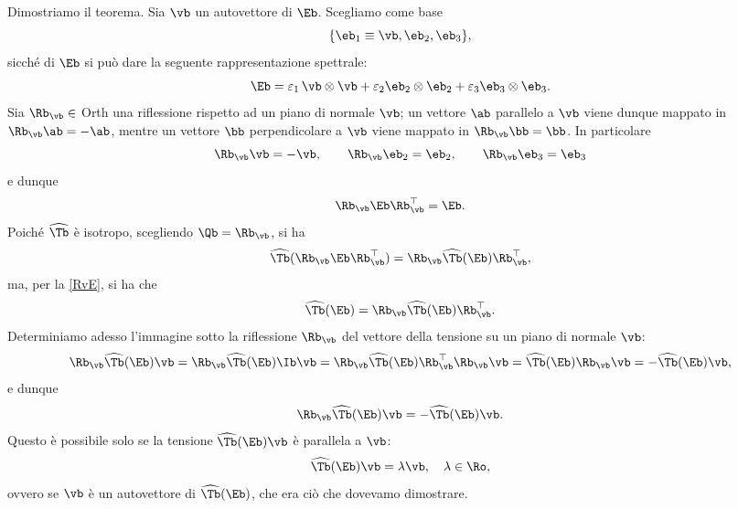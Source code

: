 Dimostriamo il teorema. Sia $\vb$ un autovettore di $\Eb$. Scegliamo come base
\begin{equation}
	\{\eb_1\equiv \vb, \eb_2, \eb_3  \},
\end{equation}
sicché di $\Eb$ si può dare la seguente rappresentazione spettrale:
\begin{equation}
	\Eb =\varepsilon_1\, \vb \otimes \vb +\varepsilon_2 \eb_2 \otimes \eb_2+ \varepsilon_3 \eb_3 \otimes \eb_3.
\end{equation}
Sia $\Rb_\vb\in$ Orth una riflessione rispetto ad un piano di normale $\vb$; un vettore $\ab$ parallelo a $\vb$ viene dunque mappato in $\Rb_\vb\ab=-\ab$, mentre un vettore $\bb$ perpendicolare a $\vb$ viene mappato in $\Rb_\vb\bb=\bb$. In particolare
\begin{equation}
	\Rb_\vb\vb =-\vb, \qquad \Rb_\vb\eb_2=\eb_2, \qquad \Rb_\vb\eb_3=\eb_3
\end{equation}
e dunque
\begin{equation}\label{RvE}
	\Rb_\vb\Eb \Rb_\vb^\top=\Eb.
\end{equation}
Poiché $\widehat{\Tb}$ è isotropo, scegliendo $\Qb=\Rb_\vb$, si ha
\begin{equation}
	\widehat{\Tb}(\Rb_\vb\Eb \Rb_\vb^\top)=\Rb_\vb\widehat{\Tb}(\Eb)\Rb_\vb^\top,
\end{equation}
ma, per la \eqref{RvE}, si ha che
\begin{equation}
	\widehat{\Tb}(\Eb)=\Rb_\vb\widehat{\Tb}(\Eb)\Rb_\vb^\top.
\end{equation}
Determiniamo adesso l'immagine sotto la riflessione $\Rb_\vb$ del vettore della tensione su un piano di normale $\vb$:
\begin{equation}
	\Rb_\vb\widehat{\Tb}(\Eb)\vb=	\Rb_\vb\widehat{\Tb}(\Eb)\Ib\vb=\Rb_\vb\widehat{\Tb}(\Eb)\Rb_\vb^\top\Rb_\vb \vb=\widehat{\Tb}(\Eb)\Rb_\vb \vb=-\widehat{\Tb}(\Eb)\vb,
\end{equation}
e dunque
\begin{equation}
\Rb_\vb\widehat{\Tb}(\Eb)\vb=-\widehat{\Tb}(\Eb)\vb.
\end{equation}
Questo è possibile solo se la tensione $\widehat{\Tb}(\Eb)\vb$ è parallela a $\vb$:
\begin{equation}
	\widehat{\Tb}(\Eb)\vb=\lambda \vb, \quad \lambda\in \Ro,
\end{equation}
ovvero se $\vb$ è un autovettore di $\widehat{\Tb}(\Eb)$, che era ciò che dovevamo dimostrare.

\vspace{.3cm}


